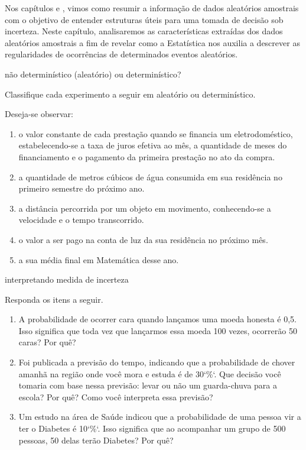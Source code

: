 Nos capítulos  e , vimos como resumir a informação de dados aleatórios amostrais com o objetivo de  entender estruturas úteis para uma tomada de decisão sob incerteza. Neste capítulo, analisaremos as características extraídas dos dados aleatórios amostrais a fim de revelar como a Estatística nos auxilia a descrever as regularidades de ocorrências de determinados eventos aleatórios.
\begin{task}{não determinístico (aleatório) ou determinístico?}
\label{ativ-aleatorioversusdeterministico}

Classifique cada experimento a seguir em aleatório ou determinístico.

Deseja-se observar:
\begin{enumerate}
\item {} 
o valor constante de cada prestação quando se financia um eletrodoméstico, estabelecendo-se a taxa de juros efetiva ao mês, a quantidade de meses do financiamento e o pagamento da primeira prestação no ato da compra.

\item {} 
a quantidade de metros cúbicos de água consumida em sua residência no primeiro semestre do próximo ano.

\item {} 
a distância percorrida por um objeto em movimento, conhecendo-se a velocidade e o tempo transcorrido.

\item {} 
o valor a ser pago na conta de luz da sua residência no próximo mês.

\item {} 
a sua média final em Matemática desse ano.

\end{enumerate}
\end{task}
\begin{task}{interpretando medida de incerteza}
\label{ativ-interpretando}

Responda os itens a seguir.
\begin{enumerate}
\item {} 
A probabilidade de ocorrer cara quando lançamos uma moeda honesta é 0,5. Isso significa que toda vez que lançarmos essa moeda 100 vezes, ocorrerão 50 caras? Por quê?

\item {} 
Foi publicada a previsão do tempo, indicando que a probabilidade de chover amanhã na região onde você mora e estuda é de 30{}`\%{}`. Que decisão você tomaria com base nessa previsão: levar ou não um guarda-chuva para a escola? Por quê? Como você interpreta essa previsão?

\item {} 
Um estudo na área de Saúde indicou que a probabilidade de uma pessoa vir a ter o Diabetes é 10{}`\%{}`. Isso significa que ao acompanhar um grupo de 500 pessoas, 50 delas terão Diabetes? Por quê?

\end{enumerate}
\end{task}
